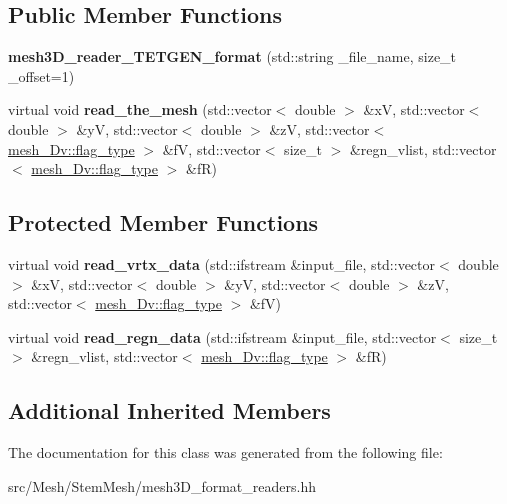 \subsection*{Public Member Functions}
\begin{DoxyCompactItemize}
\item 
\mbox{\label{classStemMesh3D_1_1mesh3D__reader__TETGEN__format_a73608ffd33247cdc03cbfd2c507e44c1}} 
{\bfseries mesh3\+D\+\_\+reader\+\_\+\+T\+E\+T\+G\+E\+N\+\_\+format} (std\+::string \+\_\+file\+\_\+name, size\+\_\+t \+\_\+offset=1)
\item 
\mbox{\label{classStemMesh3D_1_1mesh3D__reader__TETGEN__format_a07a29d1335c5c8f4adb1af49be254fde}} 
virtual void {\bfseries read\+\_\+the\+\_\+mesh} (std\+::vector$<$ double $>$ \&xV, std\+::vector$<$ double $>$ \&yV, std\+::vector$<$ double $>$ \&zV, std\+::vector$<$ \hyperlink{classStemMesh3D_1_1mesh__3Dv_a9544cba555b60f17f04fcd1689314338}{mesh\+\_\+Dv\+::flag\+\_\+type} $>$ \&fV, std\+::vector$<$ size\+\_\+t $>$ \&regn\+\_\+vlist, std\+::vector$<$ \hyperlink{classStemMesh3D_1_1mesh__3Dv_a9544cba555b60f17f04fcd1689314338}{mesh\+\_\+Dv\+::flag\+\_\+type} $>$ \&fR)
\end{DoxyCompactItemize}
\subsection*{Protected Member Functions}
\begin{DoxyCompactItemize}
\item 
\mbox{\label{classStemMesh3D_1_1mesh3D__reader__TETGEN__format_a60a1ec3c1931d8945b217f26c0f49053}} 
virtual void {\bfseries read\+\_\+vrtx\+\_\+data} (std\+::ifstream \&input\+\_\+file, std\+::vector$<$ double $>$ \&xV, std\+::vector$<$ double $>$ \&yV, std\+::vector$<$ double $>$ \&zV, std\+::vector$<$ \hyperlink{classStemMesh3D_1_1mesh__3Dv_a9544cba555b60f17f04fcd1689314338}{mesh\+\_\+Dv\+::flag\+\_\+type} $>$ \&fV)
\item 
\mbox{\label{classStemMesh3D_1_1mesh3D__reader__TETGEN__format_a9ce35774f3e82a7fb367d66ab38132f3}} 
virtual void {\bfseries read\+\_\+regn\+\_\+data} (std\+::ifstream \&input\+\_\+file, std\+::vector$<$ size\+\_\+t $>$ \&regn\+\_\+vlist, std\+::vector$<$ \hyperlink{classStemMesh3D_1_1mesh__3Dv_a9544cba555b60f17f04fcd1689314338}{mesh\+\_\+Dv\+::flag\+\_\+type} $>$ \&fR)
\end{DoxyCompactItemize}
\subsection*{Additional Inherited Members}


The documentation for this class was generated from the following file\+:\begin{DoxyCompactItemize}
\item 
src/\+Mesh/\+Stem\+Mesh/mesh3\+D\+\_\+format\+\_\+readers.\+hh\end{DoxyCompactItemize}
